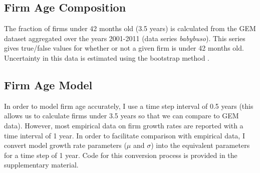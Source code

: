 \subsection*{Firm Age Composition}

The fraction of firms under 42 months old (3.5 years) is calculated from the GEM dataset aggregated over the years 2001-2011
(data series \textit{babybuso}). This series gives true/false values for whether or not a given firm is under 42 months old. Uncertainty in this data is estimated using the bootstrap method \cite{efron_introduction_1994}.

\subsection*{Firm Age Model}

In order to model firm age accurately,  I use a time step interval of 0.5 years (this allows us to calculate firms under 3.5 years so that we can compare to GEM data). However, most empirical data on firm growth rates are reported with a time interval of 1 year. In order to facilitate comparison with empirical data, I convert model growth rate parameters ($\mu$ and $\sigma$) into the equivalent parameters for a time step of 1 year. Code for this conversion process is provided in the supplementary material.


